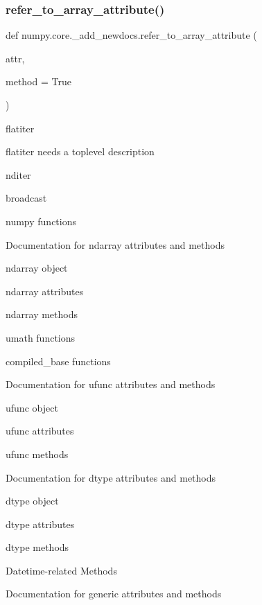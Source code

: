 \subsubsection{\texorpdfstring{refer\+\_\+to\+\_\+array\+\_\+attribute()}{refer\_to\_array\_attribute()}}
{\footnotesize\ttfamily def numpy.\+core.\+\_\+add\+\_\+newdocs.\+refer\+\_\+to\+\_\+array\+\_\+attribute (\begin{DoxyParamCaption}\item[{}]{attr,  }\item[{}]{method = {\ttfamily True} }\end{DoxyParamCaption})}



flatiter 

flatiter needs a toplevel description

nditer

broadcast

numpy functions

Documentation for ndarray attributes and methods

ndarray object

ndarray attributes

ndarray methods

umath functions

compiled\+\_\+base functions

Documentation for ufunc attributes and methods

ufunc object

ufunc attributes

ufunc methods

Documentation for dtype attributes and methods

dtype object

dtype attributes

dtype methods

Datetime-\/related Methods

Documentation for {\ttfamily generic} attributes and methods 